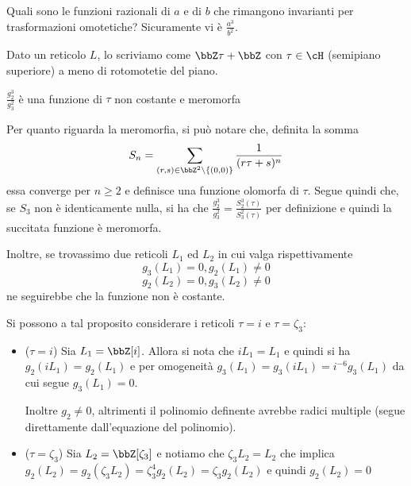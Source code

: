 Quali sono le funzioni razionali di $a$ e di $b$ che rimangono
invarianti per trasformazioni omotetiche? Sicuramente vi è
$\frac{a^3}{b^2}$.

Dato un reticolo $L$, lo scriviamo come $\bbZ \tau + \bbZ$ con $\tau \in
\cH$ (semipiano superiore) a meno di rotomotetie del piano.

\begin{proposizione}
  $\frac{g_2^3}{g_3^2}$ è una funzione di $\tau$ non costante e meromorfa
\end{proposizione}

Per quanto riguarda la meromorfia, si può notare che, definita la somma
$$S_n = \sum_{(r, s) \in \bbZ^2 \setminus \{(0, 0)\}} \frac{1}{(r \tau
  + s)^n}$$ essa converge per $n \ge 2$ e definisce una funzione olomorfa
di $\tau$. Segue quindi che, se $S_3$ non è identicamente nulla, si ha
che $\frac{g_2^3}{g_3^2} = \frac{S_2^3(\tau)}{S_3^2(\tau)}$ per
definizione e quindi la succitata funzione è meromorfa.


Inoltre, se trovassimo due reticoli $L_1$ ed $L_2$ in cui valga
rispettivamente
$$g_3(L_1) = 0, g_2(L_1) \neq 0$$
$$g_2(L_2) = 0, g_3(L_2) \neq 0$$
ne seguirebbe che la funzione non è costante.

Si possono a tal proposito considerare i reticoli $\tau = i$ e
$\tau = \zeta_3$:
\begin{itemize}
\item ($\tau = i$) Sia $L_1 = \bbZ[i]$. Allora si nota che $i L_1 = L_1$
  e quindi si ha $g_2(i L_1) = g_2(L_1)$ e per omogeneità
  $g_3(L_1) = g_3(i L_1) = i^{-6} g_3(L_1)$ da cui segue $g_3(L_1) = 0$.

  Inoltre $g_2 \neq 0$, altrimenti il polinomio definente avrebbe radici
  multiple (segue direttamente dall'equazione del polinomio).

\item ($\tau = \zeta_3$) Sia $L_2 = \bbZ[\zeta_3]$ e notiamo che
  $\zeta_3 L_2 = L_2$ che implica $g_2(L_2) = g_2(\zeta_3 L_2) =
  \zeta_3^4 g_2(L_2) = \zeta_3 g_2(L_2)$ e quindi $g_2(L_2) = 0$
\end{itemize}

